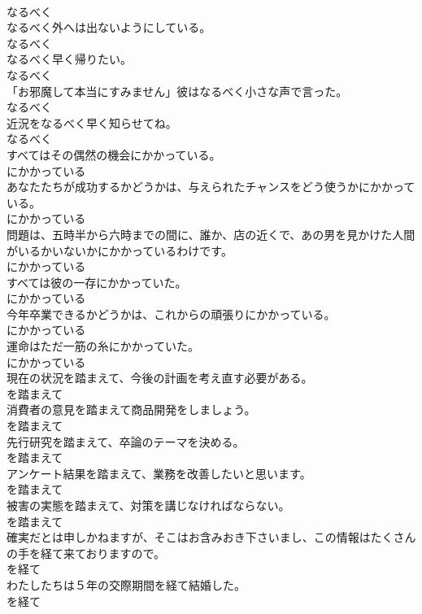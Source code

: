 \documentclass[8pt]{extreport}
\begin{document}
\begin{CJK}{UTF8}{min}
\\	なるべく
\\	なるべく外へは出ないようにしている。	
\\	なるべく
\\	なるべく早く帰りたい。	
\\	なるべく
\\	「お邪魔して本当にすみません」彼はなるべく小さな声で言った。	
\\	なるべく
\\	近況をなるべく早く知らせてね。	
\\	なるべく
\\	すべてはその偶然の機会にかかっている。	
\\	にかかっている
\\	あなたたちが成功するかどうかは、与えられたチャンスをどう使うかにかかっている。	
\\	にかかっている
\\	問題は、五時半から六時までの間に、誰か、店の近くで、あの男を見かけた人間がいるかいないかにかかっているわけです。	
\\	にかかっている
\\	すべては彼の一存にかかっていた。	
\\	にかかっている
\\	今年卒業できるかどうかは、これからの頑張りにかかっている。	
\\	にかかっている
\\	運命はただ一筋の糸にかかっていた。	
\\	にかかっている
\\	現在の状況を踏まえて、今後の計画を考え直す必要がある。	
\\	を踏まえて
\\	消費者の意見を踏まえて商品開発をしましょう。	
\\	を踏まえて
\\	先行研究を踏まえて、卒論のテーマを決める。	
\\	を踏まえて
\\	アンケート結果を踏まえて、業務を改善したいと思います。	
\\	を踏まえて
\\	被害の実態を踏まえて、対策を講じなければならない。	
\\	を踏まえて
\\	確実だとは申しかねますが、そこはお含みおき下さいまし、この情報はたくさんの手を経て来ておりますので。	
\\	を経て
\\	わたしたちは５年の交際期間を経て結婚した。	
\\	を経て

\end{CJK}
\end{document}
